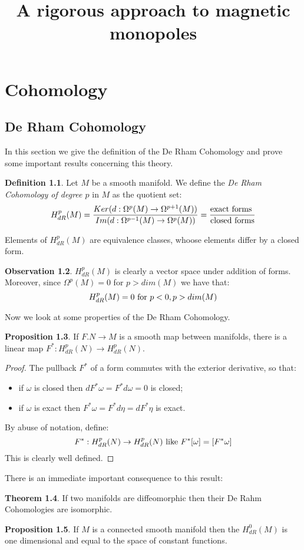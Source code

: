 \documentclass[12pt,a4paper]{report}
\title{A rigorous approach to magnetic monopoles}
\theoremstyle{definition}
\newtheorem{Def}{Definition}[chapter]
\theoremstyle{Theorem}
\newtheorem{Theo}[Def]{Theorem}
\newtheorem{Prop}[Def]{Proposition}
\theoremstyle{definition}
\theoremstyle{definition}
\newtheorem{Obs}[Def]{Observation}
\begin{document}
	\chapter{Cohomology}
	\section{De Rham Cohomology}
	In this section we give the definition of the De Rham Cohomology and prove some important results concerning this theory.
	\begin{Def}
		Let $M$ be a smooth manifold. We define the \textit{De Rham Cohomology of degree $p$} in $M$ as the quotient set:
		$$H_{dR}^p(M)={Ker(d:\Omega^p(M)\rightarrow \Omega^{p+1}(M))\over Im(d:\Omega^{p-1}(M)\rightarrow \Omega^{p}(M))}={\hbox{exact forms }\over \hbox{closed forms}}$$ 
	\end{Def}
	Elements of $H_{dR}^p(M)$ are equivalence classes, whoose elements differ by a closed form.
	\begin{Obs}
		$H_{dR}^p(M)$ is clearly a vector space under addition of forms. Moreover, since $\Omega^p(M)=0$ for $p>dim(M)$ we have that:
		$$H^p_{dR}(M)=0\hbox{ for }p<0,p>dim(M)$$
	\end{Obs}
	Now we look at some properties of the De Rham Cohomology.
	\begin{Prop}
		If $F.N\rightarrow M$ is a smooth map between manifolds, there is a linear map $F^*:H^p_{dR}(N)\rightarrow H^p_{dR}(N)$.
	\end{Prop}
	\begin{proof}
		The pullback $F^*$ of a form commutes with the exterior derivative, so that:
		\begin{itemize}
			\item if $\omega$ is closed then $dF^*\omega=F^*d\omega=0$ is closed;
			\item if $\omega$ is exact then $F^*\omega=F^*d\eta=dF^*\eta$ is exact.
		\end{itemize}
		By abuse of notation, define:
		$$F^*:H^p_{dR}(N)\rightarrow H^p_{dR}(N) \hbox{ like }F^*[\omega]=[F^*\omega]$$
		This is clearly well defined.
	\end{proof}
	There is an immediate important consequence to this result:
	\begin{Theo}
		If two manifolds are diffeomorphic then their De Rahm Cohomologies are isomorphic.
	\end{Theo}
	\begin{Prop}
		If $M$ is a connected smooth manifold then the $H^0_{dR}(M)$ is one dimensional and equal to the space of constant functions.
	\end{Prop}
\end{document}
